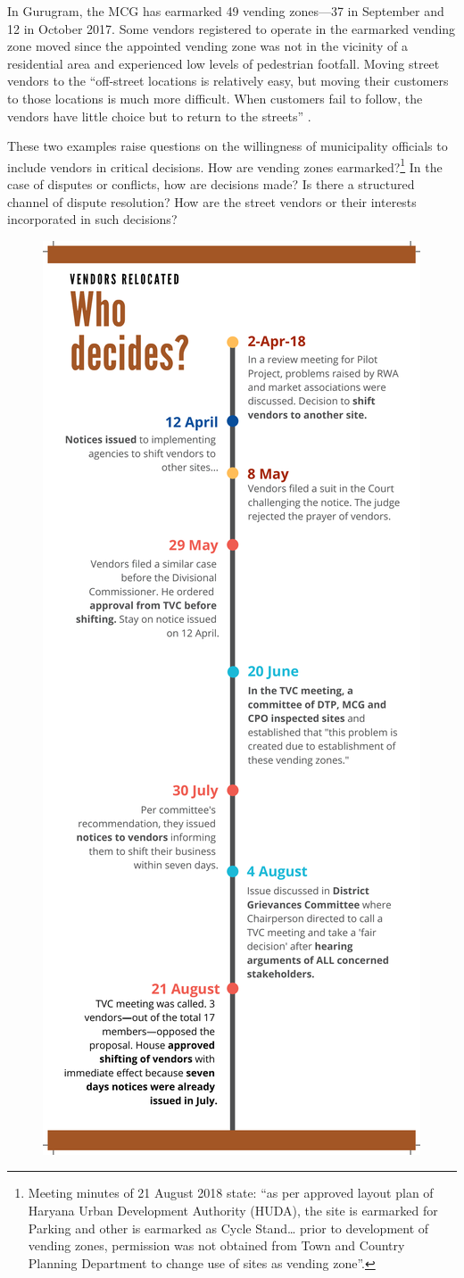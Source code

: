 \documentclass[a4paper, 12pt, twoside]{article}
\begin{document}
{{In Gurugram, the MCG has earmarked 49 vending zones—37 in September and 12 in October 2017. Some vendors registered to operate in  the earmarked vending zone  moved since the appointed vending zone was not in the vicinity of a residential area and experienced low levels of pedestrian footfall. Moving street vendors to the “off-street locations is relatively easy, but moving their customers to those locations is much more difficult. When customers fail to follow, the vendors have little choice but to return to the streets” \parencite{bromleypaper}.

These two examples raise questions on the willingness of municipality officials to include vendors in critical decisions. How are vending zones earmarked?\footnote{Meeting minutes of 21 August 2018 state: “as per approved layout plan of Haryana Urban Development Authority (HUDA), the site is earmarked for Parking and other is earmarked as Cycle Stand… prior to development of vending zones, permission was not obtained from Town and Country Planning Department to change use of sites as vending zone”.} In the case of disputes or conflicts, how are decisions made? Is there a structured channel of dispute resolution? How are the street vendors or their interests incorporated in such decisions?

\begin{figure}
\centering
\includegraphics[height=1.15\textwidth]{WhoDecides.pdf}
\end{figure}

}}
\end{document}
